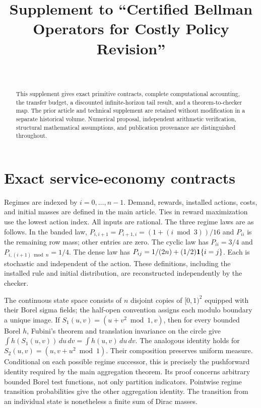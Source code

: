 
\setlength{\tabcolsep}{3pt}

\begin{frontmatter}
\title{Supplement to ``Certified Bellman Operators for Costly Policy Revision''}
\begin{aug}\author[id=au1,addressref={add1}]{~}\address[id=add1]{}\end{aug}
\begin{abstract}This supplement gives exact primitive contracts, complete computational accounting, the transfer budget, a discounted infinite-horizon tail result, and a theorem-to-checker map. The prior article and technical supplement are retained without modification in a separate historical volume. Numerical proposal, independent arithmetic verification, structural mathematical assumptions, and publication provenance are distinguished throughout.\end{abstract}
\end{frontmatter}

\section{Exact service-economy contracts}
Regimes are indexed by $i=0,\ldots,n-1$. Demand, rewards, installed actions, costs, and initial masses are defined in the main article. Ties in reward maximization use the lowest action index. All inputs are rational. The three regime laws are as follows. In the banded law, $P_{i,i+1}=P_{i+1,i}=(1+(i\bmod3))/16$ and $P_{ii}$ is the remaining row mass; other entries are zero. The cyclic law has $P_{ii}=3/4$ and $P_{i,(i+1)\bmod n}=1/4$. The dense law has $P_{ij}=1/(2n)+(1/2)\mathbf 1\{i=j\}$. Each is stochastic and independent of the action. These definitions, including the installed rule and initial distribution, are reconstructed independently by the checker.

The continuous state space consists of $n$ disjoint copies of $[0,1)^2$ equipped with their Borel sigma fields; the half-open convention assigns each modulo boundary a unique image. If $S_1(u,v)=(u+v^2\bmod1,v)$, then for every bounded Borel $h$, Fubini's theorem and translation invariance on the circle give $\int h(S_1(u,v))\,du\,dv=\int h(u,v)\,du\,dv$. The analogous identity holds for $S_2(u,v)=(u,v+u^2\bmod1)$. Their composition preserves uniform measure. Conditional on each possible regime successor, this is precisely the pushforward identity required by the main aggregation theorem. Its proof concerns arbitrary bounded Borel test functions, not only partition indicators. Pointwise regime transition probabilities give the other aggregation identity. The transition from an individual state is nonetheless a finite sum of Dirac masses.

